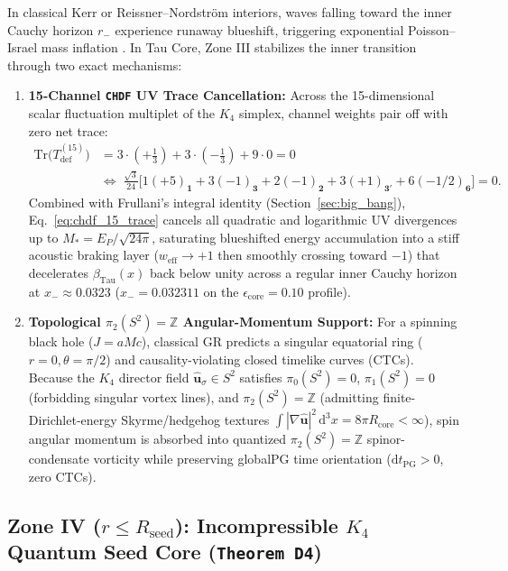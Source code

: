 \documentclass[11pt,a4paper]{article}
\theoremstyle{remark}
\begin{document}
In classical Kerr or Reissner--Nordstr\"om interiors, waves falling toward the inner Cauchy horizon $r_-$ experience runaway blueshift, triggering exponential Poisson--Israel mass inflation \cite{PoissonIsrael1990}. In Tau Core, Zone III stabilizes the inner transition through two exact mechanisms:
\begin{enumerate}
  \item \textbf{15-Channel \texttt{CHDF} UV Trace Cancellation:} Across the 15-dimensional scalar fluctuation multiplet of the $K_4$ simplex, channel weights pair off with zero net trace:
  \begin{align}
    \mathrm{Tr}\!\bigl(T_{\mathrm{def}}^{(15)}\bigr)
    &= 3\cdot\!\left(+\frac{1}{3}\right) + 3\cdot\!\left(-\frac{1}{3}\right) + 9\cdot 0 = 0 \nonumber\\
    &\Longleftrightarrow\;
    \frac{\sqrt{3}}{24}\bigl[1(+5)_{\mathbf{1}} + 3(-1)_{\mathbf{3}} + 2(-1)_{\mathbf{2}} + 3(+1)_{\mathbf{3}'} + 6(-1/2)_{\mathbf{6}}\bigr] = 0.
    \label{eq:chdf_15_trace}
  \end{align}
  Combined with Frullani's integral identity (Section~\ref{sec:big_bang}), Eq.~\eqref{eq:chdf_15_trace} cancels all quadratic and logarithmic UV divergences up to $M_* = E_P/\sqrt{24\pi}$, saturating blueshifted energy accumulation into a stiff acoustic braking layer ($w_{\mathrm{eff}} \to +1$ then smoothly crossing toward $-1$) that decelerates $\beta_{\mathrm{Tau}}(x)$ back below unity across a regular inner Cauchy horizon at $x_- \approx 0.0323$ ($x_- = 0.032311$ on the $\epsilon_{\mathrm{core}} = 0.10$ profile).
  \item \textbf{Topological $\pi_2(S^2) = \mathbb{Z}$ Angular-Momentum Support:} For a spinning black hole ($J = aMc$), classical GR predicts a singular equatorial ring ($r = 0, \theta = \pi/2$) and causality-violating closed timelike curves (CTCs). Because the $K_4$ director field $\hat{\mathbf{u}}_\sigma \in S^2$ satisfies $\pi_0(S^2) = 0$, $\pi_1(S^2) = 0$ (forbidding singular vortex lines), and $\pi_2(S^2) = \mathbb{Z}$ (admitting finite-Dirichlet-energy Skyrme/hedgehog textures $\int |\nabla\hat{\mathbf{u}}|^2\,\mathrm{d}^3x = 8\pi R_{\mathrm{core}} < \infty$), spin angular momentum is absorbed into quantized $\pi_2(S^2) = \mathbb{Z}$ spinor-condensate vorticity while preserving globalPG time orientation ($\mathrm{d}t_{\mathrm{PG}} > 0$, zero CTCs).
\end{enumerate}

\subsection{Zone IV (\texorpdfstring{$r \le R_{\mathrm{seed}}$}{r <= R\_seed}): Incompressible \texorpdfstring{$K_4$}{K4} Quantum Seed Core (\texttt{Theorem D4})}
\end{document}
